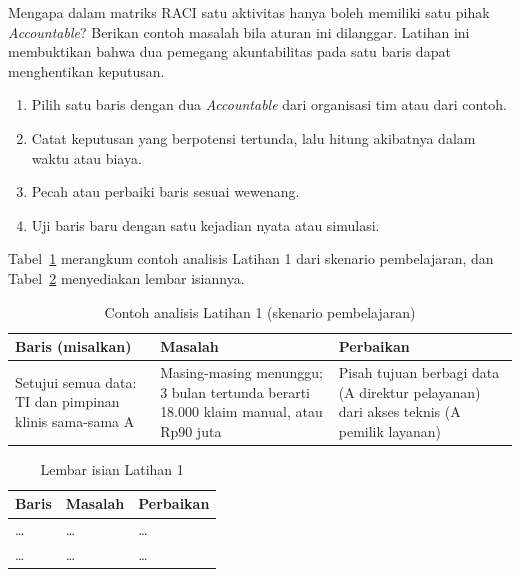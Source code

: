 Mengapa dalam matriks RACI satu aktivitas hanya boleh memiliki satu pihak \textit{Accountable}?
Berikan contoh masalah bila aturan ini dilanggar. Latihan ini membuktikan bahwa dua pemegang
akuntabilitas pada satu baris dapat menghentikan keputusan.

\begin{enumerate}
  \item Pilih satu baris dengan dua \textit{Accountable} dari organisasi tim atau dari contoh.
  \item Catat keputusan yang berpotensi tertunda, lalu hitung akibatnya dalam waktu atau biaya.
  \item Pecah atau perbaiki baris sesuai wewenang.
  \item Uji baris baru dengan satu kejadian nyata atau simulasi.
\end{enumerate}

Tabel~\ref{tab:ch08-lat1-contoh} merangkum contoh analisis Latihan 1 dari skenario pembelajaran,
dan Tabel~\ref{tab:ch08-lat1-hasil} menyediakan lembar isiannya.

\begin{table}[!htb]
  \centering\small
  \caption{Contoh analisis Latihan 1 (skenario pembelajaran)}\label{tab:ch08-lat1-contoh}
  \begin{tabularx}{\textwidth}{|>{\raggedright\arraybackslash}X|>{\raggedright\arraybackslash}X|>{\raggedright\arraybackslash}X|}
    \hline
    \textbf{Baris (misalkan)} & \textbf{Masalah} & \textbf{Perbaikan} \\ \hline
    Setujui semua data: TI dan pimpinan klinis sama-sama A & Masing-masing menunggu; 3 bulan
    tertunda berarti 18.000 klaim manual, atau Rp90 juta & Pisah tujuan berbagi data (A direktur
    pelayanan) dari akses teknis (A pemilik layanan) \\ \hline
  \end{tabularx}
\end{table}

\begin{table}[!htb]
  \centering\small
  \caption{Lembar isian Latihan 1}\label{tab:ch08-lat1-hasil}
  \begin{tabularx}{\textwidth}{|>{\raggedright\arraybackslash}X|>{\raggedright\arraybackslash}X|>{\raggedright\arraybackslash}X|}
    \hline
    \textbf{Baris} & \textbf{Masalah} & \textbf{Perbaikan} \\ \hline
    \dots & \dots & \dots \\ \hline
    \dots & \dots & \dots \\ \hline
  \end{tabularx}
\end{table}

